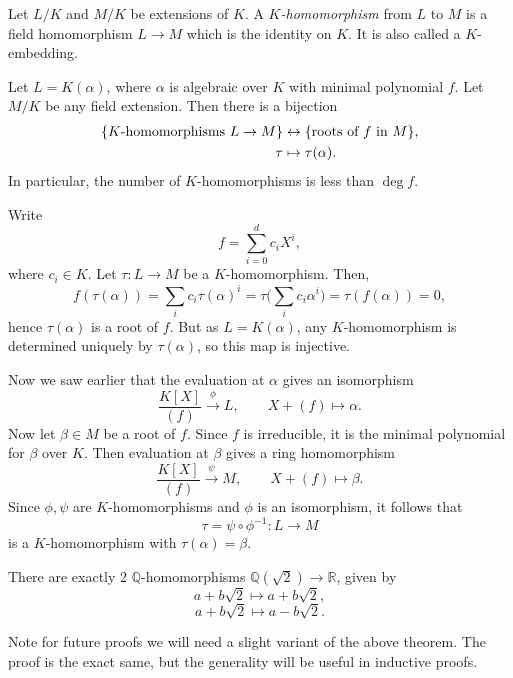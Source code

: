 \documentclass[12pt]{article}
\begin{document}
\begin{definition}
	Let $L/K$ and $M/K$ be extensions of $K$. A $K$\emph{-homomorphism} from $L$ to $M$ is a field homomorphism $L \to M$ which is the identity on $K$. It is also called a $K$-embedding.
\end{definition}

\begin{theorem}
	Let $L = K(\alpha)$, where $\alpha$ is algebraic over $K$ with minimal polynomial $f$. Let $M/K$ be any field extension. Then there is a bijection
	\begin{align*}
		\{K\text{\normalfont{-homomorphisms }} L \to M\} &\leftrightarrow \{\text{\normalfont{roots of }} f \text{\normalfont{ in }} M\}, \\
		\tau &\mapsto \tau(\alpha).
	\end{align*}
	In particular, the number of $K$-homomorphisms is less than $\deg f$.
\end{theorem}

\begin{proofbox}
	Write
	\[
	f = \sum_{i = 0}^{d} c_i X^{i},
	\]
	where $c_i \in K$. Let $\tau : L \to M$ be a $K$-homomorphism. Then,
	 \[
	f(\tau(\alpha)) = \sum_{i} c_i \tau(\alpha)^i = \tau \Biggl( \sum_{i} c_i \alpha^{i} \Biggr) = \tau(f(\alpha)) = 0,
	\]
	hence $\tau(\alpha)$ is a root of $f$. But as $L = K(\alpha)$, any $K$-homomorphism is determined uniquely by $\tau(\alpha)$, so this map is injective.

	Now we saw earlier that the evaluation at $\alpha$ gives an isomorphism
	\[
		\frac{K[X]}{(f)} \overset{\phi}{\to} L, \qquad X + (f) \mapsto \alpha.
	\]
	Now let $\beta \in M$ be a root of $f$. Since $f$ is irreducible, it is the minimal polynomial for $\beta$ over $K$. Then evaluation at $\beta$ gives a ring homomorphism
	\[
		\frac{K[X]}{(f)} \overset{\psi}{\to} M, \qquad X + (f) \mapsto \beta.
	\]
	Since $\phi, \psi$ are $K$-homomorphisms and $\phi$ is an isomorphism, it follows that
	\[
	\tau = \psi \circ \phi^{-1} : L \to M
	\]
	is a $K$-homomorphism with $\tau(\alpha) = \beta$.
\end{proofbox}

\begin{exbox}
	There are exactly 2 $\mathbb{Q}$-homomorphisms $\mathbb{Q}(\sqrt 2) \to \mathbb{R}$, given by
	\[
	a + b \sqrt 2 \mapsto a + b \sqrt 2,
	\]
	\[
	a + b \sqrt 2 \mapsto a - b \sqrt 2.
	\]
\end{exbox}

Note for future proofs we will need a slight variant of the above theorem. The proof is the exact same, but the generality will be useful in inductive proofs.
\end{document}
